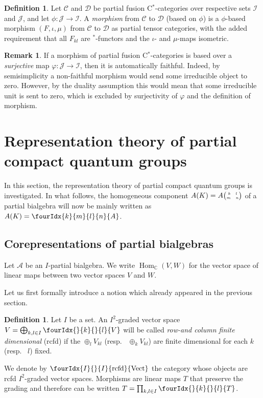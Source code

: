 \documentclass[11pt]{article}
\DeclareMathOperator{\Hom}{Hom}
\DeclareMathOperator{\rcf}{\mathrm{rcfd}}
\newcommand{\C}{\mathbb{C}}
\newcommand{\CatCC}{\mathscr{C}}
\newcommand{\CatDD}{\mathscr{D}}
\newcommand{\Vectrcf}{\Gr{\mathrm{Vect}}{I}{I}{}{\rcf}}
\newcommand{\eGr}[5]{#1{{\tiny \begin{pmatrix} #2 \quad #3 \\ #4 \quad #5\end{pmatrix}}}}
\newcommand{\Gr}[5]{\fourIdx{#2}{#4}{#3}{#5}{#1}}%
\newcommand{\Gru}[3]{\Gr{#1}{}{}{#2}{#3}}
\theoremstyle{definition}
\newtheorem{Def}[Theorem]{Definition}
\newtheorem{Rem}[Theorem]{Remark}
\numberwithin{equation}{section}
\begin{document}
\begin{Def} Let $\CatCC$ and $\CatDD$ be partial fusion C$^*$-categories over respective sets $\mathscr{I}$ and $\mathscr{J}$, and let $\phi:\mathscr{J}\rightarrow \mathscr{I}$. 
A \emph{morphism} from $\CatCC$ to $\CatDD$ (based on $\phi$) is a $\phi$-based morphism $(F,\iota,\mu)$ from $\CatCC$ to $\CatDD$ as partial tensor categories, with the added requirement that all $F_{kl}$ are $^*$-functors and the $\iota$- and $\mu$-maps isometric. 
\end{Def} 

\begin{Rem} If a morphism of partial fusion C$^*$-categories is based over a \emph{surjective} map $\varphi: \mathscr{J}\rightarrow \mathscr{I}$, then it is automatically faithful. Indeed, by semisimplicity a non-faithful morphism would send some irreducible object to zero. However, by the duality assumption this would mean that some irreducible unit is sent to zero, which is excluded by surjectivity of $\varphi$ and the definition of morphism.
\end{Rem}


\section{Representation theory of partial compact quantum groups}

In this section, the representation theory of partial compact quantum groups is investigated. In what follows, the homogeneous component $A(K) = \eGr{A}{k}{l}{m}{n}$ of a partial bialgebra will now be mainly written as $A(K) = \Gr{A}{k}{l}{m}{n}$. 

\subsection{Corepresentations of partial bialgebras}


Let $\mathscr{A}$ be an $I$-partial bialgebra. We write
$\Hom_\C(V,W)$ for the vector space of linear maps between two vector
spaces $V$ and $W$.

Let us first formally introduce a notion which already appeared in the previous section.

\begin{Def} Let $I$ be a set. An $I^{2}$-graded vector space $V=\bigoplus_{k,l\in I} \Gru{V}{k}{l}$ will be called \emph{row-and column finite dimensional} (rcfd) if the $\oplus_l V_{kl}$ (resp.~ $\oplus_k V_{kl}$) are finite dimensional for each $k$ (resp.~ $l$) fixed. 

We denote by  $\Vectrcf$ the category whose objects are rcfd $I^{2}$-graded vector spaces. Morphisms are linear maps $T$ that preserve the grading and therefore
can be written $T=\prod_{k,l\in I} \Gru{T}{k}{l}$. 
\end{Def} 
\end{document}
